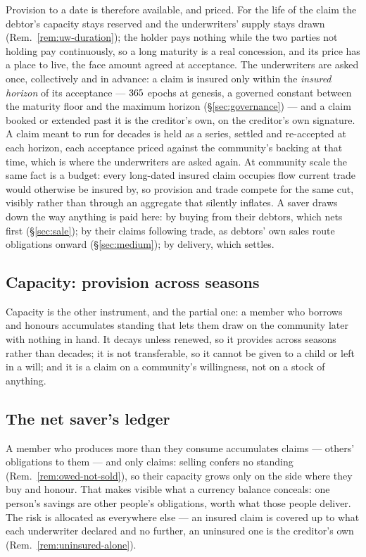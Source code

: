 Provision to a date is therefore available, and priced. For the life of the claim the
debtor's capacity stays reserved and the underwriters' supply stays drawn
(Rem.~\ref{rem:uw-duration}); the holder pays nothing while the two parties not holding
pay continuously, so a long maturity is a real concession, and its price has a place to
live, the face amount agreed at acceptance. The underwriters are asked once, collectively
and in advance: a claim is insured only within the \emph{insured horizon} of its
acceptance --- $365$ epochs at genesis, a governed constant between
the maturity floor and the maximum horizon (\S\ref{sec:governance}) --- and a claim booked
or extended past it is the creditor's own, on the creditor's own signature. A claim meant
to run for decades is held as a series, settled and re-accepted at each horizon, each
acceptance priced against the community's backing at that time, which is where the
underwriters are asked again. At community scale the same fact is a budget: every
long-dated insured claim occupies flow current trade would otherwise be insured by, so
provision and trade compete for the same cut, visibly rather than through an aggregate
that silently inflates. A saver draws down the way anything is paid here: by buying from
their debtors, which nets first (\S\ref{sec:sale}); by their claims following trade, as
debtors' own sales route obligations onward (\S\ref{sec:medium}); by delivery, which
settles.

\subsection{Capacity: provision across seasons}

Capacity is the other instrument, and the partial one: a member who borrows and honours
accumulates standing that lets them draw on the community later with nothing in hand. It
decays unless renewed, so it provides across seasons rather than decades; it is not
transferable, so it cannot be given to a child or left in a will; and it is a claim on a
community's willingness, not on a stock of anything.

\subsection{The net saver's ledger}

A member who produces more than they consume accumulates claims --- others' obligations
to them --- and only claims: selling confers no standing (Rem.~\ref{rem:owed-not-sold}),
so their capacity grows only on the side where they buy and honour. That makes visible
what a currency balance conceals: one person's savings are other people's obligations,
worth what those people deliver. The risk is allocated as everywhere else --- an insured
claim is covered up to what each underwriter declared and no further, an uninsured one is
the creditor's own (Rem.~\ref{rem:uninsured-alone}).

